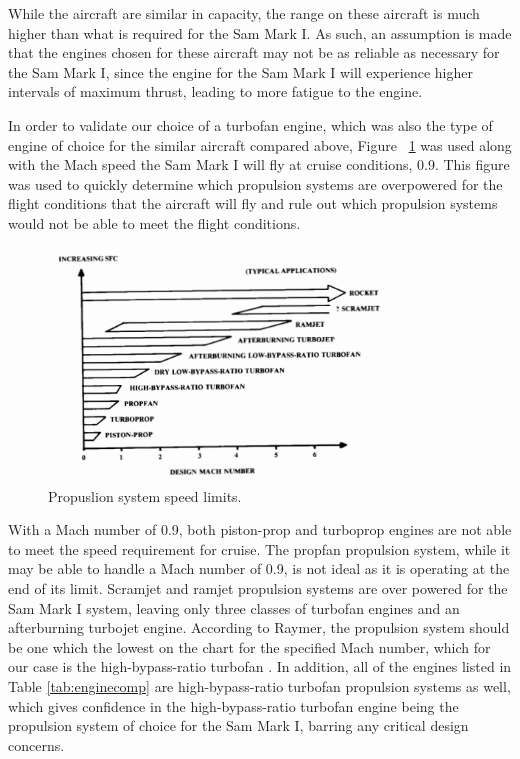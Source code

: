 While the aircraft are similar in capacity, the range on these aircraft is much higher than what is required for the Sam Mark I. As such, an assumption is made that the engines chosen for these aircraft may not be as reliable as necessary for the Sam Mark I, since the engine for the Sam Mark I will experience higher intervals of maximum thrust, leading to more fatigue to the engine. 

In order to validate our choice of a turbofan engine, which was also the type of engine of choice for the similar aircraft compared above, Figure ~\ref{PropSelection} was used along with the Mach speed the Sam Mark I will fly at cruise conditions, 0.9. This figure was used to quickly determine which propulsion systems are overpowered for the flight conditions that the aircraft will fly and rule out which propulsion systems would not be able to meet the flight conditions.

\begin{figure} [h!]
    \centering
    \includegraphics[width=0.8\textwidth]{Photos/PropSelection.PNG}
    \caption{Propuslion system speed limits. \cite{raymer}}
    \label{PropSelection}
\end{figure}

\newpage
With a Mach number of 0.9, both piston-prop and turboprop engines are not able to meet the speed requirement for cruise. The propfan propulsion system, while it may be able to handle a Mach number of 0.9, is not ideal as it is operating at the end of its limit. Scramjet and ramjet propulsion systems are over powered for the Sam Mark I system, leaving only three classes of turbofan engines and an afterburning turbojet engine. According to Raymer, the propulsion system should be one which the lowest on the chart for the specified Mach number, which for our case is the high-bypass-ratio turbofan \cite{raymer}. In addition, all of the engines listed in Table \ref{tab:enginecomp} are high-bypass-ratio turbofan propulsion systems as well, which gives confidence in the high-bypass-ratio turbofan engine being the propulsion system of choice for the Sam Mark I, barring any critical design concerns.


